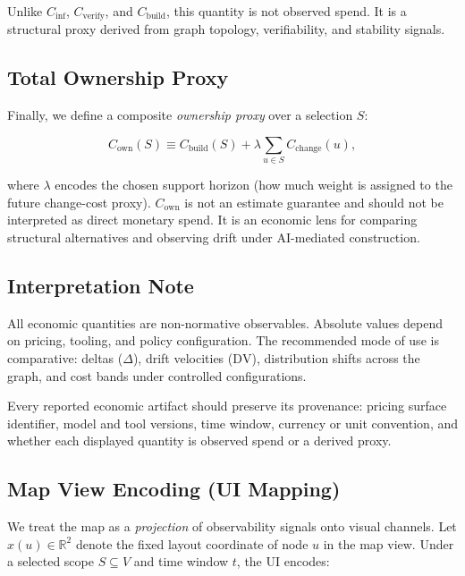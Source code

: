 \documentclass{aastex701}
\begin{document}
Unlike $C_{\mathrm{inf}}$, $C_{\mathrm{verify}}$, and $C_{\mathrm{build}}$,
this quantity is not observed spend. It is a structural proxy derived from
graph topology, verifiability, and stability signals.

\subsection{Total Ownership Proxy}

Finally, we define a composite \emph{ownership proxy} over a selection $S$:

\begin{equation}
C_{\mathrm{own}}(S) \equiv
C_{\mathrm{build}}(S) + \lambda \sum_{u \in S} C_{\mathrm{change}}(u),
\end{equation}

where $\lambda$ encodes the chosen support horizon (how much weight is assigned
to the future change-cost proxy). $C_{\mathrm{own}}$ is not an estimate guarantee
and should not be interpreted as direct monetary spend. It is an economic lens
for comparing structural alternatives and observing drift under AI-mediated
construction.

\subsection{Interpretation Note}

All economic quantities are non-normative observables. Absolute values depend on
pricing, tooling, and policy configuration. The recommended mode of use is
comparative: deltas ($\Delta$), drift velocities ($\mathrm{DV}$), distribution
shifts across the graph, and cost bands under controlled configurations.

Every reported economic artifact should preserve its provenance: pricing surface
identifier, model and tool versions, time window, currency or unit convention,
and whether each displayed quantity is observed spend or a derived proxy.

\subsection{Map View Encoding (UI Mapping)}

We treat the map as a \emph{projection} of observability signals onto visual channels.
Let $x(u)\in\mathbb{R}^2$ denote the fixed layout coordinate of node $u$ in the map view.
Under a selected scope $S\subseteq V$ and time window $t$, the UI encodes:
\end{document}
